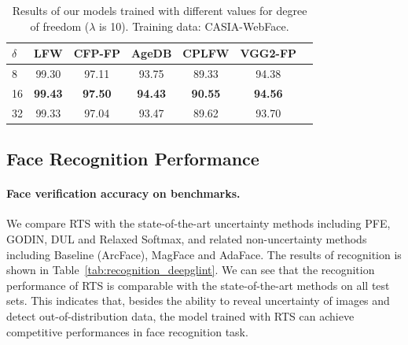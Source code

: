 \documentclass[letterpaper]{article} %
\begin{document}
\begin{table}
\begin{center}
\begin{tabular}{|l|c|c|c|c|c|c|}
\hline
$\delta$ & LFW & CFP-FP & AgeDB & CPLFW & VGG2-FP \\
\hline\hline
8 & 99.30 & 97.11 & 93.75 & 89.33 & 94.38 \\
16 & \textbf{99.43} & \textbf{97.50} & \textbf{94.43} & \textbf{90.55} & \textbf{94.56} \\
32 & 99.33 & 97.04 & 93.47 & 89.62 & 93.70 \\
\hline
\end{tabular}
\end{center}
\caption{Results of our models trained with different values for degree of freedom ($\lambda$ is 10). Training data: CASIA-WebFace.}
\label{tab:degree_of_freedom}
\end{table}





\subsection{Face Recognition Performance}
\label{ssec:face recognition}
\paragraph{Face verification accuracy on benchmarks.} We compare RTS with the state-of-the-art uncertainty methods including PFE, GODIN, DUL and Relaxed Softmax, and related non-uncertainty methods including Baseline (ArcFace), MagFace and AdaFace. 
%
The results of recognition is shown in Table~\ref{tab:recognition_deepglint}. We can see that the recognition performance of RTS is comparable with the state-of-the-art methods on all test sets. This indicates that, besides the ability to reveal uncertainty of images and detect out-of-distribution data, the model trained with RTS can achieve competitive performances in face recognition task. 
\end{document}
